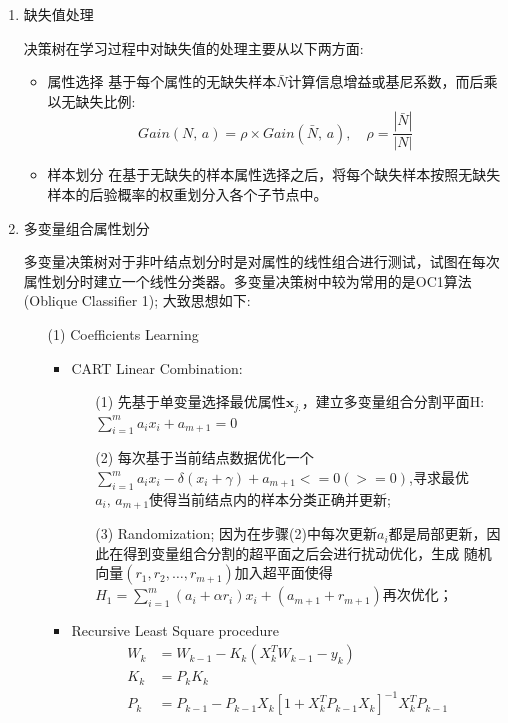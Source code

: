 \documentclass[a4paper]{article}
\begin{document}
\begin{enumerate}
\begin{itemize}
			\end{itemize}

		\item 缺失值处理\par
			决策树在学习过程中对缺失值的处理主要从以下两方面:
				\begin{itemize}
					\item 属性选择
						基于每个属性的无缺失样本$\bar{N}$计算信息增益或基尼系数，而后乘以无缺失比例:
						$$Gain(N,\,a) = \rho \times Gain(\bar{N},\,a),\quad \rho = \frac{|\bar{N}|}{|N|}$$
					\item 样本划分
						在基于无缺失的样本属性选择之后，将每个缺失样本按照无缺失样本的后验概率的权重划分入各个子节点中。
				\end{itemize}

		\item 多变量组合属性划分\par
			多变量决策树对于非叶结点划分时是对属性的线性组合进行测试，试图在每次属性划分时建立一个线性分类器。多变量决策树中较为常用的是OC1算法(Oblique Classifier 1);
			大致思想如下:
				\begin{itemize}

					\item[(1)] Coefficients Learning\par
						\begin{itemize}

							\item CART Linear Combination:
								\begin{itemize}
									\item[(1)] 先基于单变量选择最优属性$\textbf{x}_{j.}$，建立多变量组合分割平面H:$\sum_{i=1}^{m}a_ix_i+a_{m+1}=0$
									\item[(2)] 每次基于当前结点数据优化一个$\sum_{i=1}^{m}a_ix_i-\delta(x_i+\gamma)+a_{m+1}<=0(>=0)$,寻求最优$a_i,\,a_{m+1}$使得当前结点内的样本分类正确并更新;
									\item[(3)] Randomization; 因为在步骤(2)中每次更新$a_i$都是局部更新，因此在得到变量组合分割的超平面之后会进行扰动优化，生成
									随机向量$(r_1,r_2,\dots, r_{m+1})$加入超平面使得$H_1 = \sum_{i=1}^{m}(a_i+\alpha r_i)x_i+(a_{m+1}+r_{m+1})$再次优化；
								\end{itemize}

							\item Recursive Least Square procedure
								\begin{align*}
								  W_k &= W_{k-1}-K_k(X_k^TW_{k-1}-y_k)\\
								  K_k &= P_kK_k\\
								  P_k &= P_{k-1} - P_{k-1}X_k[1+X_k^TP_{k-1}X_k]^{-1}X_k^TP_{k-1}
								\end{align*}


\end{itemize}
\end{itemize}
\end{enumerate}
\end{document}
